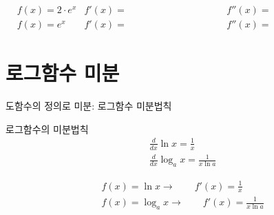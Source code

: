 \documentclass[aspectratio=169]{beamer}
\begin{document}
\begin{frame}
  \begin{align*}
    & f(x) = 2\cdot e^x & f'(x)= \hspace{4cm} & f''(x)= \hspace{4cm}\\[2em]
    & f(x) = e^x        & f'(x)= \hspace{4cm} & f''(x)= \hspace{4cm}
  \end{align*}
\end{frame}






\section{로그함수 미분}

\begin{frame}{도함수의 정의로 미분: 로그함수 미분법칙}
  \begin{block}{로그함수의 미분법칙}
    \begin{align*}
      & \frac{d}{dx} \ln x = \frac{1}{x} \\
      & \frac{d}{dx} \log_a x = \frac{1}{x \ln a} 
    \end{align*}
  \end{block}
  \begin{align*}
    & f(x) = \ln x    \rightarrow \qquad  f'(x) = \frac{1}{x} \\
    & f(x) = \log_a x \rightarrow \qquad  f'(x) = \frac{1}{x \ln a}
  \end{align*}
\end{frame}
\end{document}
